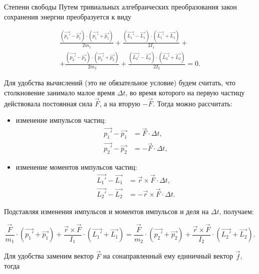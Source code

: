 \documentclass{article}
\begin{document}
\begin{section}{Степени свободы}
		Путем тривиальных алгебраических преобразования закон сохранения энергии преобразуется к виду

		\begin{multline*}
			\frac{\left( \vec{p_1'} - \vec{p_1} \right) \cdot \left( \vec{p_1'} + \vec{p_1} \right)}{2m_1} + \frac{\left( \vec{L_1'} - \vec{L_1} \right) \cdot \left( \vec{L_1'} + \vec{L_1} \right)}{2I_1} + \\
			+ \frac{\left( \vec{p_2'} - \vec{p_2} \right) \cdot \left( \vec{p_2'} + \vec{p_2} \right)}{2m_2} + \frac{\left( \vec{L_2'} - \vec{L_2} \right) \cdot \left( \vec{L_2'} + \vec{L_2} \right)}{2I_2} = 0.
		\end{multline*}

		Для удобства вычислений (это не обязательное условие) будем считать, что столкновение занимало малое время $\Delta t$, во время которого на первую частицу действовала постоянная сила $\vec{F}$, а на вторую $-\vec{F}$. Тогда можно рассчитать:

		\begin{itemize}
			\item изменение импульсов частиц:
			\begin{align*}
				\vec{p_1'} - \vec{p_1} &= \vec{F} \cdot \Delta t, \\
				\vec{p_2'} - \vec{p_2} &= -\vec{F} \cdot \Delta t,
			\end{align*}

			\item изменение моментов импульсов частиц:
			\begin{align*}
				\vec{L_1'} - \vec{L_1} &= \vec{r} \times \vec{F} \cdot \Delta t, \\
				\vec{L_2'} - \vec{L_2} &= -\vec{r} \times \vec{F} \cdot \Delta t.
			\end{align*}
		\end{itemize}

		Подставляя изменения импульсов и моментов импульсов и деля на $\Delta t$, получаем:

		\begin{equation*}
			\frac{\vec{F}}{m_1} \cdot \left( \vec{p_1'} + \vec{p_1} \right) + \frac{\vec{r} \times \vec{F}}{I_1} \cdot \left( \vec{L_1'} + \vec{L_1} \right) = \frac{\vec{F}}{m_2} \cdot \left( \vec{p_2'} + \vec{p_2} \right) + \frac{\vec{r} \times \vec{F}}{I_2} \cdot \left( \vec{L_2'} + \vec{L_2} \right).
		\end{equation*}

		Для удобства заменим вектор $\vec{F}$ на сонаправленный ему единичный вектор $\vec{f}$, тогда


\end{section}
\end{document}
